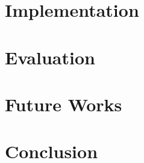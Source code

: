 \chapter{Implementation}











\chapter{Evaluation}



\chapter{Future Works}


\chapter{Conclusion}


\appendix




\printbibliography

